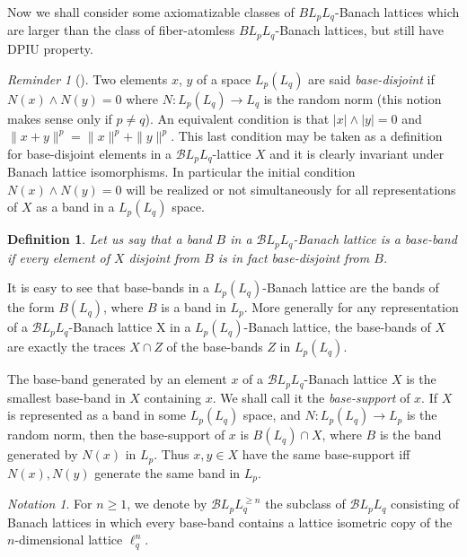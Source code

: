 \documentclass[11pt]{amsart}
\theoremstyle{plain}
\newtheorem{definition}[theorem]{Definition}
\theoremstyle{remark}
\newtheorem{notation}[theorem]{Notation}
\newtheorem{recall}[theorem]{Reminder}
\begin{document}
Now we shall consider some axiomatizable classes of $BL_pL_q$-Banach lattices which are larger than the class of fiber-atomless $BL_pL_q$-Banach lattices, but still have DPIU property.

\begin{recall}[{\cite[section 2]{HR-11}}] Two elements $x$, $y$ of a space $L_p(L_q)$ are said {\it base-disjoint} if $N(x)\wedge N(y)=0$ where $N:L_p(L_q)\to L_q$ is the random norm (this notion makes sense only if $p\ne q$). An equivalent condition is that  $|x|\wedge |y|=0$ and $\|x+y\|^p=\|x\|^p+\|y\|^p$. This last condition may be taken as a definition for  base-disjoint elements in a $\mathcal BL_pL_q$-lattice $X$ and it is clearly invariant under Banach lattice isomorphisms. In particular the initial condition $N(x)\wedge N(y)=0$ will be realized or not simultaneously for all representations of $X$ as a band in a $L_p(L_q)$ space.
\end{recall}

\begin{definition}
Let us say that a band $B$ in a $\mathcal BL_pL_q$-Banach lattice is a base-band if every element of $X$ disjoint from $B$ is in fact base-disjoint from $B$.
\end{definition}

It is easy to see that base-bands in a $L_p(L_q)$-Banach lattice are the bands of the form $B(L_q)$, where $B$ is a band in $L_p$. More generally for any representation of a $\mathcal BL_pL_q$-Banach lattice X in a $L_p(L_q)$-Banach lattice, the base-bands of $X$ are exactly the traces $X\cap Z$ of the base-bands $Z$ in $L_p(L_q)$.

The base-band generated by an element $x$ of a $\mathcal BL_pL_q$-Banach lattice $X$ is the smallest base-band in $X$ containing $x$. We shall call it the {\it base-support} of $x$. If $X$ is represented as a band in some $L_p(L_q)$ space, and $N: L_p(L_q)\to L_p$ is the random norm, then the base-support of $x$ is $B(L_q)\cap X$, where $B$ is the band generated by  $N(x)$ in $L_p$. Thus $x,y\in X$ have the same base-support iff $N(x),N(y)$ generate the same band in $L_p$.


\begin{notation}
For $n\ge 1$,  we denote  by $\mathcal BL_pL_q^{\ge n}$ the subclass of $\mathcal BL_pL_q$ consisting of Banach lattices in which every base-band contains a lattice isometric copy of the $n$-dimensional lattice  $\ell_q^n$.
\end{notation}
\end{document}
